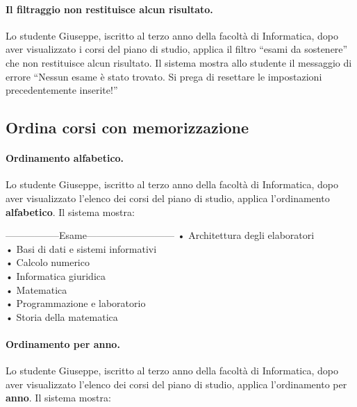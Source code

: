 \paragraph{Il filtraggio non restituisce alcun risultato.}
Lo studente Giuseppe, iscritto al terzo anno della facoltà di Informatica, dopo aver visualizzato i corsi del piano di studio, applica il filtro “esami da sostenere” che non restituisce alcun risultato. Il sistema mostra allo studente il messaggio di errore “Nessun esame è stato trovato. Si prega di resettare le impostazioni precedentemente inserite!”


\subsection{Ordina corsi con memorizzazione}
\paragraph{Ordinamento alfabetico.}
Lo studente Giuseppe, iscritto al terzo anno della facoltà di Informatica, dopo aver visualizzato l’elenco dei corsi del piano di studio, applica l’ordinamento \textbf{alfabetico}. Il sistema mostra:

\begin{tabbing}
	\hspace{1cm}-----------------Esame--------------------------- \kill
	\hspace{1cm} • Architettura degli elaboratori \\
	\hspace{1cm} • Basi di dati e sistemi informativi \\
	\hspace{1cm} • Calcolo numerico \\
	\hspace{1cm} • Informatica giuridica \\
	\hspace{1cm} • Matematica \\
	\hspace{1cm} • Programmazione e laboratorio \\
	\hspace{1cm} • Storia della matematica \\
\end{tabbing}

\paragraph{Ordinamento per anno.}
Lo studente Giuseppe, iscritto al terzo anno della facoltà di Informatica, dopo aver visualizzato l’elenco dei corsi del piano di studio, applica l’ordinamento per \textbf{anno}. Il sistema mostra:

